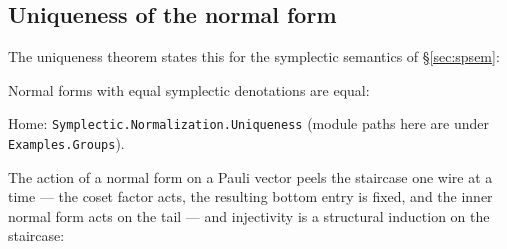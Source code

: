 \subsection{Uniqueness of the normal form}\label{sec:uniqueness}

The uniqueness theorem states this for the symplectic semantics of
\S\ref{sec:spsem}:

\begin{theorem}\label{thm:unique}
Normal forms with equal symplectic denotations are equal:
\begin{code}%
\>[0]\AgdaSpace{}%
\AgdaSymbol{:}\AgdaSpace{}%
\AgdaSpace{}%
\AgdaSpace{}%
\AgdaSymbol{\{}\AgdaSpace{}%
\AgdaSpace{}%
\AgdaSymbol{:}\AgdaSpace{}%
\AgdaSpace{}%
\AgdaSymbol{\}}\AgdaSpace{}%
\AgdaSpace{}%
\AgdaSpace{}%
\AgdaOperator{\AgdaFunction{[}}\AgdaSpace{}%
\AgdaSpace{}%
\AgdaOperator{\AgdaFunction{]}}\AgdaSpace{}%
\AgdaSpace{}%
\AgdaSpace{}%
\AgdaSpace{}%
\AgdaOperator{\AgdaFunction{[}}\AgdaSpace{}%
\AgdaSpace{}%
\AgdaOperator{\AgdaFunction{]}}\AgdaSpace{}%
\AgdaSpace{}%
\AgdaSpace{}%
\AgdaSpace{}%
\AgdaSpace{}%
\<%
\end{code}
\begin{code}[hide]%
\>[0]\AgdaSpace{}%
\AgdaSymbol{=}\AgdaSpace{}%
\<%
\end{code}
\noindent Home: \texttt{Symplectic.Normalization.Uniqueness} (module
paths here are under \texttt{Examples.Groups}).
\end{theorem}

\noindent The action of a normal form on a Pauli vector peels the
staircase one wire at a time --- the coset factor acts, the resulting
bottom entry is fixed, and the inner normal form acts on the tail ---
and injectivity is a structural induction on the staircase:

